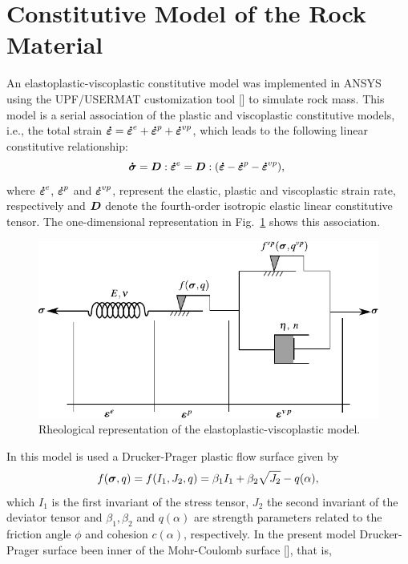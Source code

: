 \documentclass[a4paper,fleqn]{cas-sc}
\begin{document}
\section{Constitutive Model of the Rock Material}\label{}

An elastoplastic-viscoplastic constitutive model was implemented in ANSYS using the UPF/USERMAT customization tool [] to simulate rock mass.  This model is a serial association of the plastic and viscoplastic constitutive models, i.e., the total strain $\boldsymbol{\dot{\varepsilon}} = \boldsymbol{\dot{\varepsilon}}^{e} + \boldsymbol{\dot{\varepsilon}}^{p} + \boldsymbol{\dot{\varepsilon}}^{vp}$, which leads to the following linear constitutive relationship:
\begin{equation} \label{eq_constitutive_relationship_epvp}
	\boldsymbol{\dot{\sigma}} = \boldsymbol{D} : \boldsymbol{\dot{\varepsilon}}^{e} = \boldsymbol{D} : (\boldsymbol{\dot{\varepsilon}} - \boldsymbol{\dot{\varepsilon}}^{p} - \boldsymbol{\dot{\varepsilon}}^{vp}),\;
\end{equation}
where $\boldsymbol{\dot{\varepsilon}}^{e}$, $\boldsymbol{\dot{\varepsilon}}^{p}$ and $\boldsymbol{\dot{\varepsilon}}^{vp}$, represent the elastic, plastic and viscoplastic strain rate, respectively and $\boldsymbol{D}$ denote the fourth-order isotropic elastic linear constitutive tensor. The one-dimensional representation in Fig.~\ref{reological_scheme} shows this association. 
\begin{figure}[h!]
	\centering
	\includegraphics[scale=1]{Rheological representation.pdf}
	\caption{Rheological representation of the elastoplastic-viscoplastic model.}
	\label{reological_scheme}
\end{figure}
In this model is used a Drucker-Prager plastic flow surface given by
\begin{equation}
	\label{eq:f_Drucker_Prager}
	f(\boldsymbol{\sigma},q) = f(I_1,J_2,q) = \beta_1 I_1 +\beta_2 \sqrt{J_2}-q(\alpha),
\end{equation}
which $I_1$ is the first invariant of the stress tensor, $J_2$ the second invariant of the deviator tensor and $\beta_1, \beta_2$ and $q(\alpha)$ are strength parameters related to the friction angle $\phi$ and cohesion $c(\alpha)$, respectively. In the present model Drucker-Prager surface been inner of the Mohr-Coulomb surface [], that is,
\end{document}
